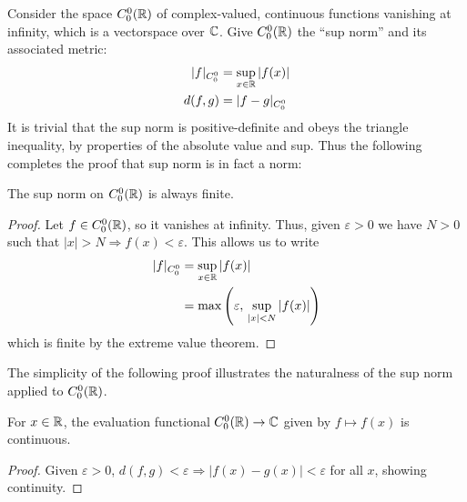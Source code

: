       Consider the space $C^0_0(\mathbb{R})$ of complex-valued, continuous functions vanishing at infinity, which is a vectorspace over $\mathbb{C}$.
      Give $C^0_0(\mathbb{R})$ the ``sup norm'' and its associated metric:
      \begin{align*}
        |f|_{C^0_0} &= \sup_{x\in\mathbb{R}}|f(x)|\\
        d(f,g) &= |f-g|_{C^0_0}
      \end{align*}
      It is trivial that the sup norm is positive-definite and obeys the triangle inequality, by properties of the absolute value and sup.
      Thus the following completes the proof that sup norm is in fact a norm:
      \begin{claim}
        The sup norm on $C^0_0(\mathbb{R})$ is always finite.
        \begin{proof}
          Let $f\in C^0_0(\mathbb{R})$, so it vanishes at infinity.
          Thus, given $\varepsilon>0$ we have $N>0$ such that $|x|>N\Rightarrow f(x)<\varepsilon$.
          This allows us to write
          \begin{align*}
            |f|_{C^0_0} &= \sup_{x\in\mathbb{R}}|f(x)|\\
            &= \max\left(\varepsilon,\,\sup_{|x|<N}|f(x)|\right)
          \end{align*}
          which is finite by the extreme value theorem.
        \end{proof}
      \end{claim}

      The simplicity of the following proof illustrates the naturalness of the sup norm applied to $C^0_0(\mathbb{R})$.
      \begin{claim}
        For $x\in\mathbb{R}$, the evaluation functional $C^0_0(\mathbb{R})\rightarrow\mathbb{C}$ given by $f\mapsto f(x)$ is continuous.
        \begin{proof}
          Given $\varepsilon > 0$, $d(f,g)<\varepsilon \Rightarrow |f(x)-g(x)|<\varepsilon$ for all $x$, showing continuity.
        \end{proof}
      \end{claim}

